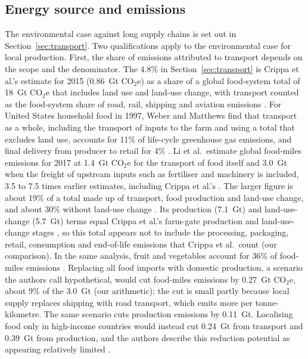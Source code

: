 \subsection{Energy source and emissions}\label{sec:nutrition-emissions}

The environmental case against long supply chains is set out in Section~\ref{sec:transport}. Two qualifications apply to the environmental case for local production. First, the share of emissions attributed to transport depends on the scope and the denominator. The 4.8\% in Section~\ref{sec:transport} is Crippa et al.'s estimate for 2015 (0.86~Gt CO$_2$e) as a share of a global food-system total of 18~Gt CO$_2$e that includes land use and land-use change, with transport counted as the food-system share of road, rail, shipping and aviation emissions \cite[pp.~198--200, 206]{crippa2021foodghg}. For United States household food in 1997, Weber and Matthews find that transport as a whole, including the transport of inputs to the farm and using a total that excludes land use, accounts for 11\% of life-cycle greenhouse gas emissions, and final delivery from producer to retail for 4\% \cite[Abstract, p.~3508; pp.~3509--3512]{weber2008foodmiles}. Li et al.\ estimate global food-miles emissions for 2017 at 1.4~Gt CO$_2$e for the transport of food itself and 3.0~Gt when the freight of upstream inputs such as fertiliser and machinery is included, 3.5 to 7.5 times earlier estimates, including Crippa et al.'s \cite[p.~446; p.~448]{li2022foodmiles}. The larger figure is about 19\% of a total made up of transport, food production and land-use change, and about 30\% without land-use change \cite[Abstract, p.~445; p.~446; Methods, p.~451]{li2022foodmiles}. Its production (7.1~Gt) and land-use-change (5.7~Gt) terms equal Crippa et al.'s farm-gate production and land-use-change stages \cite[p.~446]{li2022foodmiles}\cite[p.~199]{crippa2021foodghg}, so this total appears not to include the processing, packaging, retail, consumption and end-of-life emissions that Crippa et al.\ count (our comparison).%
 In the same analysis, fruit and vegetables account for 36\% of food-miles emissions \cite[Abstract, p.~445]{li2022foodmiles}. Replacing all food imports with domestic production, a scenario the authors call hypothetical, would cut food-miles emissions by 0.27~Gt CO$_2$e, about 9\% of the 3.0~Gt (our arithmetic); the cut is small partly because local supply replaces shipping with road transport, which emits more per tonne-kilometre. The same scenario cuts production emissions by 0.11~Gt. Localising food only in high-income countries would instead cut 0.24~Gt from transport and 0.39~Gt from production, and the authors describe this reduction potential as appearing relatively limited \cite[pp.~448--449]{li2022foodmiles}.

